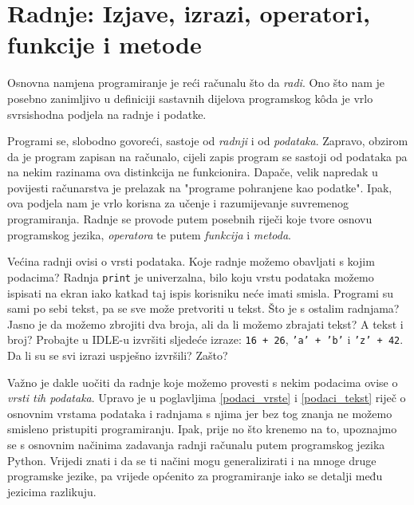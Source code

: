 

\section{Radnje: Izjave, izrazi, operatori, funkcije i metode}\label{radnje}

Osnovna namjena programiranje je reći računalu što da \emph{radi}. Ono što nam je posebno zanimljivo u definiciji sastavnih dijelova programskog kôda je vrlo svrsishodna podjela na radnje i podatke.

Programi se, slobodno govoreći, sastoje od \emph{radnji} i od \emph{podataka}. Zapravo, obzirom da je program zapisan na računalo, cijeli zapis program se sastoji od podataka pa na nekim razinama ova distinkcija ne funkcionira. Dapače, velik napredak u povijesti računarstva je prelazak na "programe pohranjene kao podatke". Ipak, ova podjela nam je vrlo korisna za učenje i razumijevanje suvremenog programiranja. Radnje se provode putem posebnih riječi koje tvore osnovu programskog jezika, \textit{operatora} te putem \textit{funkcija} i \textit{metoda}.

Većina radnji ovisi o vrsti podataka. Koje radnje možemo obavljati s kojim podacima? Radnja \texttt{print} je univerzalna, bilo koju vrstu podataka možemo ispisati na ekran iako katkad taj ispis korisniku neće imati smisla. Programi su sami po sebi tekst, pa se sve može pretvoriti u tekst. Što je s ostalim radnjama? Jasno je da možemo zbrojiti dva broja, ali da li možemo zbrajati tekst? A tekst i broj? Probajte u IDLE-u izvršiti sljedeće izraze: \texttt{16 + 26}, \texttt{'a' + 'b'} i \texttt{'z' + 42}. Da li su se svi izrazi uspješno izvršili? Zašto?

Važno je dakle uočiti da radnje koje možemo provesti s nekim podacima ovise o \emph{vrsti tih podataka}. Upravo je u poglavljima \ref{podaci_vrste} i \ref{podaci_tekst} riječ o osnovnim vrstama podataka i radnjama s njima jer bez tog znanja ne možemo smisleno pristupiti programiranju. Ipak, prije no što krenemo na to, upoznajmo se s osnovnim načinima zadavanja radnji računalu putem programskog jezika Python. Vrijedi znati i da se ti načini mogu generalizirati i na mnoge druge programske jezike, pa vrijede općenito za programiranje iako se detalji među jezicima razlikuju.


